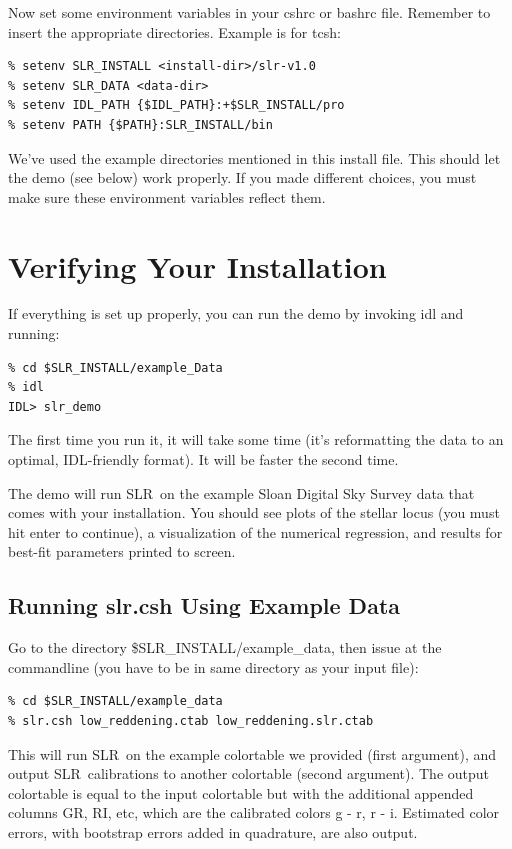 \documentclass{report}
\newcommand{\slr}{SLR}
\begin{document}
Now set some environment variables in your cshrc or bashrc file. Remember to insert the appropriate directories. Example is for tcsh:
\begin{verbatim}
% setenv SLR_INSTALL <install-dir>/slr-v1.0
% setenv SLR_DATA <data-dir>
% setenv IDL_PATH {$IDL_PATH}:+$SLR_INSTALL/pro
% setenv PATH {$PATH}:SLR_INSTALL/bin
\end{verbatim}

We've used the example directories mentioned in this install file. This should let the demo (see below) work properly. If you made different choices, you must make sure these environment variables reflect them.

\section{Verifying Your Installation}
\label{sec:verify}

If everything is set up properly, you can run the demo by invoking idl and running:
\begin{verbatim}
% cd $SLR_INSTALL/example_Data
% idl
IDL> slr_demo
\end{verbatim}

The first time you run it, it will take some time (it's reformatting
the data to an optimal, IDL-friendly format). It will be faster the
second time.

The demo will run \slr\ on the example Sloan Digital Sky Survey data
that comes with your installation. You should see plots of the stellar
locus (you must hit enter to continue), a visualization of the
numerical regression, and results for best-fit parameters printed to
screen.


\subsection{Running slr.csh Using Example Data}

Go to the directory \$SLR\_INSTALL/example\_data, then issue at
the commandline (you have to be in same directory as your input file):
\begin{verbatim}
% cd $SLR_INSTALL/example_data
% slr.csh low_reddening.ctab low_reddening.slr.ctab
\end{verbatim}

This will run \slr\ on the example colortable we provided (first
argument), and output \slr\ calibrations to another colortable (second
argument). The output colortable is equal to the input colortable but
with the additional appended columns GR, RI, etc, which are the
calibrated colors g - r, r - i. Estimated color errors, with bootstrap
errors added in quadrature, are also output.
\end{document}
